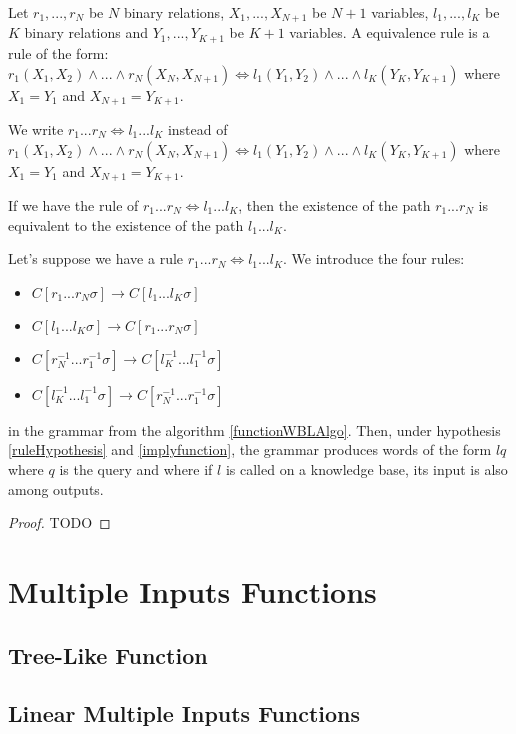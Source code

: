 \documentclass[10pt,a4paper,draft]{article}
\begin{document}
\begin{definition}
Let $r_1,..., r_N$ be $N$ binary relations, $X_1,..., X_{N+1}$ be $N+1$ variables, $l_1,..., l_K$ be $K$ binary relations and $Y_1,..., Y_{K+1}$ be $K+1$ variables. A equivalence rule is a rule of the form:
$r_1(X_1, X_2) \wedge ... \wedge r_N(X_N, X_{N+1}) \Leftrightarrow l_1(Y_1, Y_2) \wedge ... \wedge l_K(Y_K, Y_{K+1})$
where $X_1 = Y_1$ and $X_{N+1} = Y_{K+1}$.
\end{definition}

\begin{notation}
We write $r_1 ... r_N \Leftrightarrow l_1 ... l_K$ instead of $r_1(X_1, X_2) \wedge ... \wedge r_N(X_N, X_{N+1}) \Leftrightarrow l_1(Y_1, Y_2) \wedge ... \wedge l_K(Y_K, Y_{K+1})$ where $X_1 = Y_1$ and $X_{N+1} = Y_{K+1}$.
\end{notation}

\begin{hypothesis}
\label{ruleHypothesis}
If we have the rule of $r_1 ... r_N \Leftrightarrow l_1 ... l_K$, then the existence of the path $r_1 ... r_N$ is equivalent to the existence of the path $l_1 ... l_K$.
\end{hypothesis}

\begin{property}
Let's suppose we have a rule $r_1 ... r_N \Leftrightarrow l_1 ... l_K$. We introduce the four rules:
\begin{itemize}
\item $C[r_1...r_N \sigma] \rightarrow C[l_1 ... l_K \sigma]$
\item $C[l_1 ... l_K \sigma] \rightarrow C[r_1...r_N \sigma]$
\item $C[r_N^{-1} ... r_1^{-1} \sigma] \rightarrow C[l_K^{-1} ... l_1^{-1} \sigma]$
\item $C[l_K^{-1} ... l_1^{-1} \sigma] \rightarrow C[r_N^{-1} ... r_1^{-1} \sigma]$
\end{itemize}
in the grammar from the algorithm \ref{functionWBLAlgo}. Then, under hypothesis \ref{ruleHypothesis} and \ref{implyfunction}, the grammar produces words of the form $lq$ where $q$ is the query and where if $l$ is called on a knowledge base, its input is also among outputs.
\end{property}

\begin{proof}
TODO
\end{proof}

\section{Multiple Inputs Functions}

\subsection{Tree-Like Function}

\subsection{Linear Multiple Inputs Functions}



\end{document}
